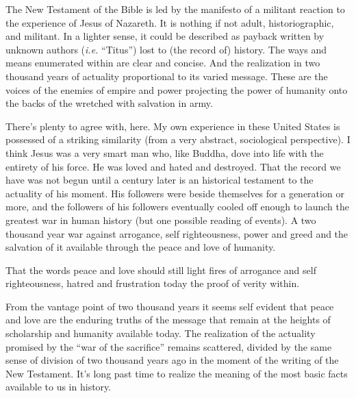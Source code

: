 

The New Testament of the Bible is led by the manifesto of a militant
reaction to the experience of Jesus of Nazareth.  It is nothing if not
adult, historiographic, and militant.  In a lighter sense, it could be
described as payback written by unknown authors ({\it i.e.} ``Titus'')
lost to (the record of) history.  The ways and means enumerated within
are clear and concise.  And the realization in two thousand years of
actuality proportional to its varied message.  These are the voices of
the enemies of empire and power projecting the power of humanity onto
the backs of the wretched with salvation in army.

There's plenty to agree with, here.  My own experience in these United
States is possessed of a striking similarity (from a very abstract,
sociological perspective).  I think Jesus was a very smart man who,
like Buddha, dove into life with the entirety of his force.  He was
loved and hated and destroyed.  That the record we have was not begun
until a century later is an historical testament to the actuality of
his moment.  His followers were beside themselves for a generation or
more, and the followers of his followers eventually cooled off enough
to launch the greatest war in human history (but one possible reading
of events).  A two thousand year war against arrogance, self
righteousness, power and greed and the salvation of it available
through the peace and love of humanity.

That the words peace and love should still light fires of arrogance
and self righteousness, hatred and frustration today the proof of
verity within.

From the vantage point of two thousand years it seems self evident
that peace and love are the enduring truths of the message that remain
at the heights of scholarship and humanity available today.  The
realization of the actuality promised by the ``war of the sacrifice''
remains scattered, divided by the same sense of division of two
thousand years ago in the moment of the writing of the New Testament.
It's long past time to realize the meaning of the most basic facts
available to us in history.

\bye
